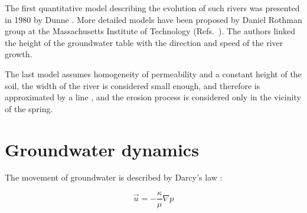 \documentclass[]{pracamgr}
\begin{document}
    The first quantitative model describing the evolution of such rivers was presented in 1980 by Dunne \cite{dunne1980formation}. More detailed models have been proposed by Daniel Rothman group at the Massachusetts Institute of Technology (Refs.~\cite{petroff2012four, devauchelle2012ramification}). The authors linked the height of the groundwater table with the direction and speed of the river growth.

    The last model assumes homogeneity of permeability and a constant height of the soil, the width of the river is considered small enough, and therefore is approximated by a line \cite{peterson1998singular,carleson2002laplacian,gubiec2008fingered}, and the erosion process is considered only in the vicinity of the spring.

    \section{Groundwater dynamics}

      The movement of groundwater is described by Darcy's law \cite{darcy1856fontaines}:
      
      \begin{equation}
        \vec{u}=-\frac{\kappa}{\mu} \nabla p
      \end{equation}	
      
\end{document}
